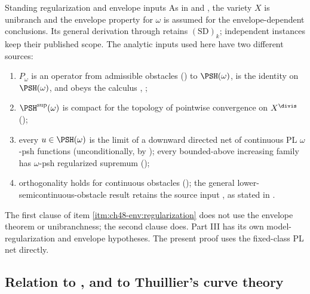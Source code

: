 \begin{important}{Standing regularization and envelope inputs}
\label{imp:ch48-envelope}
As in  and , the
variety $X$ is unibranch and the envelope property for $\omega$ is assumed
for the envelope-dependent conclusions. Its general derivation through
 retains $\mathrm{(SD)}_k$; independent
instances keep their published scope.
The analytic inputs used here have two different sources:
\begin{enumerate}
\item\label{itm:ch48-env:operator}
      $P_\omega$ is an operator from admissible obstacles
      () to $\PSH(\omega)$, is the
      identity on $\PSH(\omega)$, and obeys the calculus
      ,
      ;
\item\label{itm:ch48-env:compact}
      $\PSH^{\sup}(\omega)$ is compact for the topology of pointwise
      convergence on $X^{\divis}$ ();
\item\label{itm:ch48-env:regularization}
      every $u\in\PSH(\omega)$ is the limit of a downward directed net of
      continuous PL $\omega$-psh functions
      (unconditionally, by ); every bounded-above
      increasing family has $\omega$-psh regularized supremum
      ();
\item\label{itm:ch48-env:orthogonality}
      orthogonality holds for continuous obstacles
      (); the general
      lower-semicontinuous-obstacle result retains the source input
      \cite[Theorem~13.1]{BJ22}, as stated in
      .
\end{enumerate}
The first clause of item \cref{itm:ch48-env:regularization} does not use
the envelope theorem or unibranchness; the second clause does.
Part III has its own model-regularization and envelope hypotheses.
The present proof uses the fixed-class PL net directly.
\end{important}

\subsection{Relation to \texorpdfstring{}{Part III}, and to Thuillier's curve theory}
\label{sec:ch48-part3}

